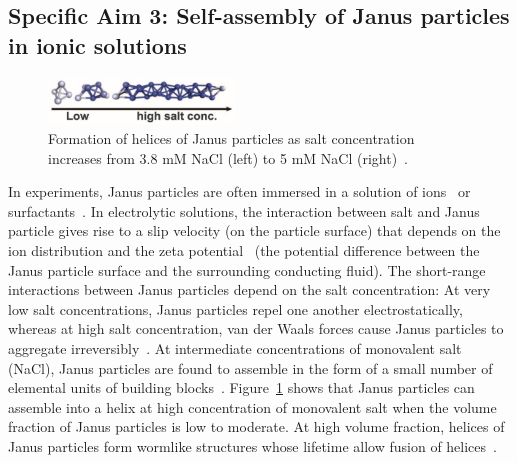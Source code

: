 \subsection{Specific Aim 3: Self-assembly of Janus particles in ionic solutions}
\label{subsec:specific_aim_3}

\begin{figure}
  \vspace{-5pt}
\centerline{\includegraphics[width=0.44\textwidth]{Figures/fig2A_Chen2011_Science}}
  \vspace{-5pt}
\caption{\label{fig:helices_of_JPs}Formation of helices
  of Janus particles as salt concentration increases from 3.8 mM NaCl
  (left) to 5 mM NaCl (right)~\cite{Chen2011_Science}.}
\end{figure}
In experiments, Janus particles are often immersed in a solution of
ions~\cite{Chen2011_Science} or surfactants~\cite{Goodwin2009}. In
electrolytic solutions, the interaction between salt and Janus particle
gives rise to a slip velocity (on the particle surface) that depends on
the ion distribution and the zeta potential~\cite{BayatiNajafi2016_JCP}
(the potential difference between the Janus particle surface and the
surrounding conducting fluid). The short-range interactions between
Janus particles depend on the salt concentration: At very low salt
concentrations, Janus particles repel one another electrostatically,
whereas at high salt concentration, van der Waals forces cause Janus
particles to aggregate irreversibly~\cite{Goodwin2009}. At intermediate
concentrations of monovalent salt (NaCl), Janus particles are found to
assemble in the form of a small number of elemental units of building
blocks~\cite{Chen2011_Science}. Figure~\ref{fig:helices_of_JPs} shows
that Janus particles can assemble into a helix at high concentration of
monovalent salt when the volume fraction of Janus particles is low to
moderate. At high volume fraction, helices of Janus particles form
wormlike structures whose lifetime allow fusion of
helices~\cite{Chen2011_Science}. 

